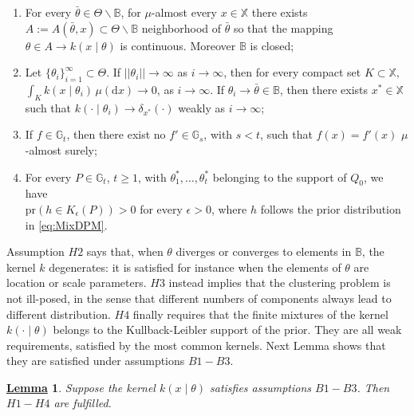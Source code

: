 \documentclass[12pt]{article}
\newtheorem{Lem}{\underline{\bf Lemma}}
\def \d {\mathrm{d}}
\begin{document}
\begin{enumerate}
\item[$H1.$] For every $\bar{\theta} \in \Theta \backslash \mathbb{B}$, for $\mu$-almost every $x \in \mathbb{X}$ there exists $A := A(\bar{\theta}, x) \subset \Theta \backslash \mathbb{B}$ neighborhood of $\bar{\theta}$ so that the mapping $\theta \in A \to k(x \mid \theta)$ is continuous. Moreover $\mathbb{B}$ is closed; 
\item[$H2.$] Let $\{\theta_i \}_{i = 1}^\infty \subset \Theta$. If $||\theta_i|| \to \infty$ as $i \to \infty$, then for every compact set $K \subset \mathbb{X},$ \\$\int_Kk(x\mid \theta_i) \, \mu(\d x) \to 0$, as $i \to \infty$. If $\theta_i \to \bar{\theta} \in \mathbb{B}$, then there exists $x^* \in \mathbb{X}$ such that $k(\cdot \mid \theta_i) \to \delta_{x^*}(\cdot)$ weakly as $i \to \infty$;%
\item[$H3.$] If $f \in \mathbb{G}_t$, then there exist no $f' \in \mathbb{G}_s$, with $s < t$, such that $f(x) = f'(x)$ $\mu$-almost surely;
\item[$H4.$] For every $P \in \mathbb{G}_t$, $t \geq 1$, with $\theta_1^*, \dots, \theta_t^*$ belonging to the support of $Q_0$, we have \\$\text{pr}(h \in K_\epsilon(P))>0$ for every $\epsilon > 0$, where $h$ follows the prior distribution in \eqref{eq:MixDPM}.
\end{enumerate}
Assumption $H2$ says that, when $\theta$ diverges or converges to elements in $\mathbb{B}$, the kernel $k$ degenerates: it is satisfied for instance when the elements of $\theta$ are location or scale parameters. $H3$ instead implies that the clustering problem is not ill-posed, in the sense that different numbers of components always lead to different distribution. $H4$ finally requires that the finite mixtures of the kernel $k(\cdot \mid \theta)$ belongs to the Kullback-Leibler support of the prior. They are all weak requirements, satisfied by the most common kernels. Next Lemma shows that they are satisfied under assumptions $B1-B3$.
\begin{Lem}\label{th:WeakConsDens}
Suppose the kernel $k(x \mid \theta)$ satisfies assumptions $B1-B3$. Then $H1-H4$ are fulfilled.
\end{Lem}
\end{document}
